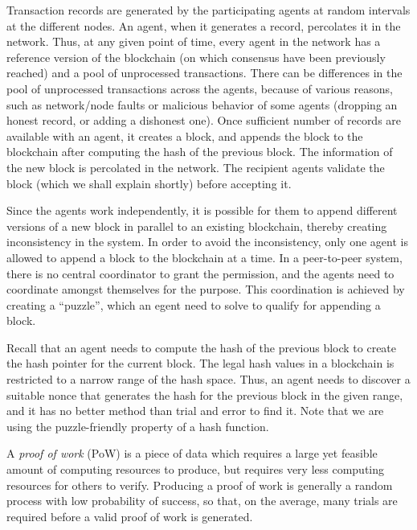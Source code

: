 Transaction records are generated by the participating agents at random intervals at the different nodes. An agent, when it generates 
a record, percolates it in the network. Thus, at any given point of time, every agent in the network has a reference version of the 
blockchain (on which consensus have been previously reached) and a pool of unprocessed transactions. There can be differences in the 
pool of unprocessed transactions across the agents, because of various reasons, such as network/node faults or malicious behavior of 
some agents (dropping an honest record, or adding a dishonest one). 
%
Once sufficient number of records are available with an agent, it creates a block, and appends the block to the blockchain after 
computing the hash of the previous block. The information of the new block is percolated in the network. The recipient agents validate
the block (which we shall explain shortly) before accepting it.

Since the agents work independently, it is possible for them to append different versions of a new block in parallel to an existing 
blockchain, thereby creating inconsistency in the system. In order to avoid the inconsistency, only one agent is allowed to append 
a block to the blockchain at a time. In a peer-to-peer system, there is no central coordinator to grant the permission, and the agents 
need to coordinate amongst themselves for the purpose. This coordination is achieved by creating a ``puzzle'', which an egent need
to solve to qualify for appending a block. 
 
Recall that an agent needs to compute the hash of the previous block to create the hash pointer for the current block. The legal 
hash values in a blockchain is restricted to a narrow range of the hash space. Thus, an agent needs to discover a suitable nonce 
that generates the hash for the previous block in the given range, and it has no better method than trial and error to find it. 
Note that we are using the puzzle-friendly property of a hash function.

\begin{definition} 
	A {\em proof of work} (PoW) is a piece of data which requires a large yet feasible amount of computing resources to produce, 
	but requires very less computing resources for others to verify. Producing a proof of work is generally a random process 
	with low probability of success, so that, on the average, many trials are required before a valid proof of work is generated. 
\end{definition}

